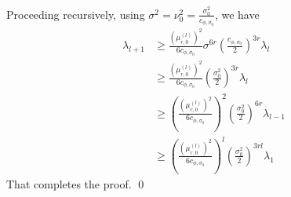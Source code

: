 Proceeding recursively, using $\sigma^2 = \nu_0^2 = \frac{\sigma_0^2}{c_{\phi,\sigma_0}}$, we have
\begin{align*}
\lambda_{l+1} & \geq\frac{ (\mu_{r,0}^{(l)})^2}{6 c_{\phi,\sigma_0}} \sigma^{6r} \left( \frac{c_{\phi,\sigma_0}}{2} \right)^{3r} \lambda_l \\
& \geq \frac{(\mu_{r,0}^{(l)})^2}{6 c_{\phi,\sigma_0}} \left( \frac{\sigma_0^2}{2} \right)^{3r} \lambda_l \\
& \geq  \left( \frac{(\mu_{r,0}^{(l)})^2}{6 c_{\phi,\sigma_0}} \right)^2 \left( \frac{\sigma_0^2}{2} \right)^{6r} \lambda_{l-1} \\
& \geq \left( \frac{(\mu_{r,0}^{(l)})^2}{6 c_{\phi,\sigma_0}} \right)^l \left( \frac{\sigma_0^2}{2} \right)^{3rl} \lambda_{1} 
\end{align*}
That completes the proof. \qed 


